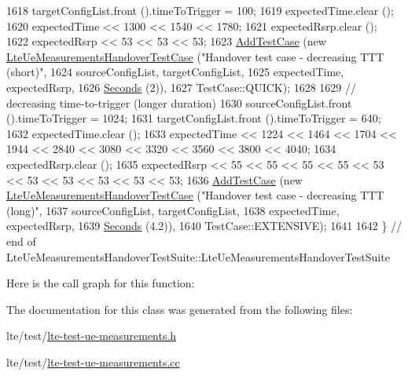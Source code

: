 \begin{DoxyCode}
1618   targetConfigList.front ().timeToTrigger = 100;
1619   expectedTime.clear ();
1620   expectedTime << 1300 << 1540 << 1780;
1621   expectedRsrp.clear ();
1622   expectedRsrp << 53 << 53 << 53;
1623   \hyperlink{classns3_1_1TestCase_a3718088e3eefd5d6454569d2e0ddd835}{AddTestCase} (\textcolor{keyword}{new} \hyperlink{classLteUeMeasurementsHandoverTestCase}{LteUeMeasurementsHandoverTestCase} (\textcolor{stringliteral}{"Handover
       test case - decreasing TTT (short)"},
1624                                                       sourceConfigList, targetConfigList,
1625                                                       expectedTime, expectedRsrp,
1626                                                       \hyperlink{group__timecivil_ga33c34b816f8ff6628e33d5c8e9713b9e}{Seconds} (2)),
1627                TestCase::QUICK);
1628 
1629   \textcolor{comment}{// decreasing time-to-trigger (longer duration)}
1630   sourceConfigList.front ().timeToTrigger = 1024;
1631   targetConfigList.front ().timeToTrigger = 640;
1632   expectedTime.clear ();
1633   expectedTime << 1224 << 1464 << 1704 << 1944 << 2840 << 3080 << 3320 << 3560 << 3800 << 4040;
1634   expectedRsrp.clear ();
1635   expectedRsrp << 55 << 55 << 55 << 55 << 53 << 53 << 53 << 53 << 53 << 53;
1636   \hyperlink{classns3_1_1TestCase_a3718088e3eefd5d6454569d2e0ddd835}{AddTestCase} (\textcolor{keyword}{new} \hyperlink{classLteUeMeasurementsHandoverTestCase}{LteUeMeasurementsHandoverTestCase} (\textcolor{stringliteral}{"Handover
       test case - decreasing TTT (long)"},
1637                                                       sourceConfigList, targetConfigList,
1638                                                       expectedTime, expectedRsrp,
1639                                                       \hyperlink{group__timecivil_ga33c34b816f8ff6628e33d5c8e9713b9e}{Seconds} (4.2)),
1640                TestCase::EXTENSIVE);
1641 
1642 \} \textcolor{comment}{// end of LteUeMeasurementsHandoverTestSuite::LteUeMeasurementsHandoverTestSuite}
\end{DoxyCode}


Here is the call graph for this function\+:




The documentation for this class was generated from the following files\+:\begin{DoxyCompactItemize}
\item 
lte/test/\hyperlink{lte-test-ue-measurements_8h}{lte-\/test-\/ue-\/measurements.\+h}\item 
lte/test/\hyperlink{lte-test-ue-measurements_8cc}{lte-\/test-\/ue-\/measurements.\+cc}\end{DoxyCompactItemize}
